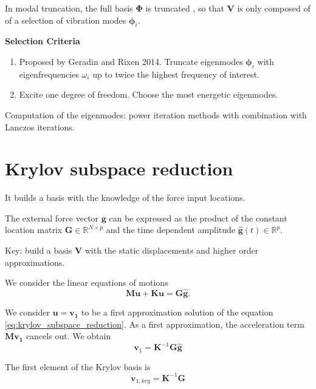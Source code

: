 \documentclass{article}
\begin{document}
In modal truncation, the full basis $\bm{\Phi}$ is truncated , so that $\bm{V}$ is only composed of 
of a selection of vibration modes $\bm{\phi}_i$. \newline

\textbf{Selection Criteria}
\begin{enumerate}
    \item Proposed by Geradin and Rixen 2014. Truncate eigenmodes $\bm{\phi}_i$ with eigenfrequencies $\omega_i$ up to twice the highest frequency of interest. 
    \item Excite one degree of freedom. Choose the most energetic eigenmodes. 
\end{enumerate}

Computation of the eigenmodes: power iteration methods with combination with Lanczos iterations.

\section{Krylov subspace reduction}

It builds a basis with the knowledge of the force input locations.\newline

The external force vector $\bm{g}$ can be expressed as the product of the constant location matrix 
$\bm{G} \in \mathbb{R}^{N \times p}$ and the time dependent amplitude $\hat{\bm{g}}(t) \in \mathbb{R}^p$.\newline

Key: build a basis $\bm{V}$ with the static displacements and higher order approximations. \newline

We consider the linear equations of motions
\begin{equation}
  \bm{M}\bm{\ddot{u}} + \bm{K}\bm{u} = \bm{G}\hat{\bm{g}}. 
  \label{eq:krylov_subspace_reduction}
\end{equation}

We consider $\bm{u}=\bm{v_1}$ to be a first approximation solution of the equation \ref{eq:krylov_subspace_reduction}. 
As a first approximation, the acceleration term $\bm{M}\bm{\ddot{v}_1}$ cancels out. We obtain 
\begin{equation}
\bm{v}_1 = \bm{K}^{-1}\bm{G}\hat{\bm{g}}
\end{equation}

The first element of the Krylov basis is
\begin{equation}
  \bm{v}_{1, kry} = \bm{K}^{-1}\bm{G}
  \end{equation}
\end{document}
